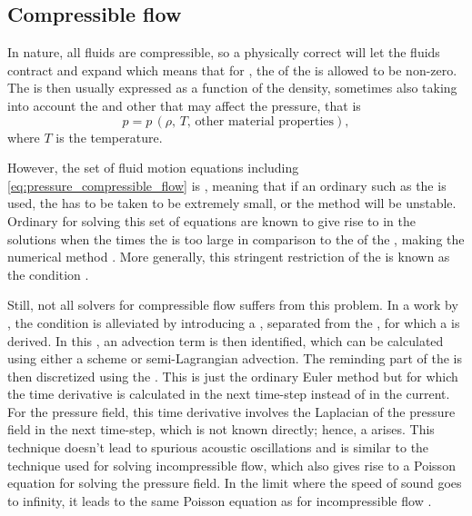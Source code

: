 \subsection{Compressible flow}

In nature, all fluids are compressible, so a physically correct  will let the fluids contract and expand which means that for , the \divergence of the  is allowed to be non-zero. The \pressure is then usually expressed as a function of the density, sometimes also taking into account the \temperature and other \properties that may affect the pressure, that is
%
\begin{equation} \label{eq:pressure_compressible_flow}
p = p\,(\rho,\,T,\,\text{other material properties}),
\end{equation}
%
where $T$ is the temperature.

However, the set of fluid motion equations including \eqref{eq:pressure_compressible_flow} is , meaning that if an ordinary  such as the  is used, the \timestep has to be taken to be extremely small, or the method will be unstable. Ordinary  for solving this set of equations are known to give rise to  in the solutions when the  times the  is too large in comparison to the  of the \cells, making the numerical method \unstable. More generally, this stringent restriction of the \timestep is known as the \CFL condition \citep{Courant1967}.

Still, not all solvers for compressible flow suffers from this problem. In a work by \citet{Kwatra2009}, the \CFL condition is alleviated by introducing a , separated from the , for which a \PDE is derived. In this \PDE, an advection term is then identified, which can be calculated using either a \HO \ENO scheme or semi-Lagrangian advection. The reminding part of the \PDE is then discretized using the . This is just the ordinary Euler method but for which the time derivative is calculated in the next time-step instead of in the current. For the pressure field, this time derivative involves the Laplacian of the pressure field in the next time-step, which is not known directly; hence, a  arises. This technique doesn't lead to spurious acoustic oscillations and is similar to the technique used for solving incompressible flow, which also gives rise to a Poisson equation for solving the pressure field. In the limit where the speed of sound goes to infinity, it leads to the same Poisson equation as for incompressible flow \citep{Kwatra2009}.

